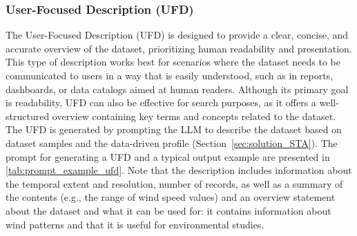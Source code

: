 \subsubsection{\textbf{User-Focused Description (UFD)}}
The User-Focused Description (UFD) is designed to provide a clear, concise, and accurate overview of the dataset, prioritizing human readability and presentation. This type of description works best for scenarios where the dataset needs to be communicated to users in a way that is easily understood, such as in reports, dashboards, or data catalogs aimed at human readers. Although its primary goal is readability, UFD can also be effective for search purposes, as it offers a well-structured overview containing key terms and concepts related to the dataset. The UFD is generated by prompting the LLM to describe the dataset based on dataset samples and the data-driven profile (Section~\ref{sec:solution_STA}).
% 
The prompt for generating a UFD and a typical output example are presented in \autoref{tab:prompt_example_ufd}.
%
Note that the description includes information about the temporal extent and resolution, number of records, as well as
a summary of the contents (e.g., the range of wind speed values)
and an overview statement about the dataset and what it can be used for: it contains information about wind patterns and that it is useful for environmental studies.
% 


